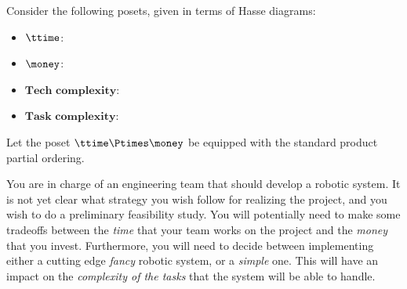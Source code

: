 \begin{gradedexercise}
    \label{ex:DPComposition}

    Consider the following posets, given in terms of Hasse diagrams:
    \begin{itemize}
        \item $\ttime$:
              \begin{center}
              \end{center}

        \item $\money$:
              \begin{center}
              \end{center}

        \item $\textbf{Tech complexity}$:
              \begin{center}
              \end{center}

        \item $\textbf{Task complexity}$:
              \begin{center}
              \end{center}
    \end{itemize}
    Let the poset $\ttime \Ptimes \money$ be equipped with the standard product partial ordering.

    You are in charge of an engineering team that should develop a robotic system.
    It is not yet clear what strategy you wish follow for realizing the project, and you wish to do a preliminary feasibility study.
    You will potentially need to make some tradeoffs between the \emph{time} that your team works on the project and the \emph{money} that you invest.
    Furthermore, you will need to decide between implementing either a cutting edge \emph{fancy} robotic system, or a \emph{simple} one.
    This will have an impact on the \emph{complexity of the tasks} that the system will be able to handle.


\end{gradedexercise}
